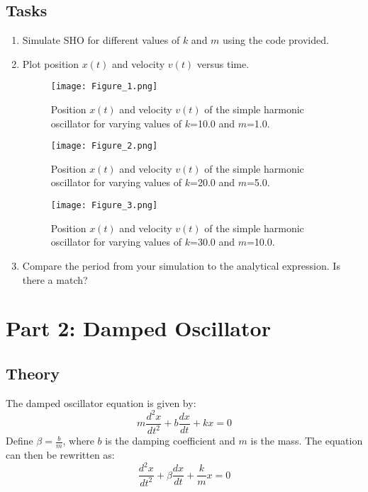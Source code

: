 \documentclass {article}
\begin{document}
\subsection*{Tasks}
\begin{enumerate}
    \item Simulate SHO for different values of $k$ and $m$ using the code provided.
    \item Plot position $x(t)$ and velocity $v(t)$ versus time.
    \begin{figure}[H]
    \centering
    \texttt{[image: Figure\_1.png]}
    \caption{Position $x(t)$ and velocity $v(t)$ of the simple harmonic oscillator for varying values of $k$=10.0 and $m$=1.0.}
    \label{fig:sho_simulation}
    \end{figure}

    \begin{figure}[H]
        \centering
        \texttt{[image: Figure\_2.png]}
        \caption{Position $x(t)$ and velocity $v(t)$ of the simple harmonic oscillator for varying values of $k$=20.0 and $m$=5.0.}
        \label{fig:sho_simulation}
    \end{figure}

    \begin{figure}[H]
        \centering
        \texttt{[image: Figure\_3.png]}
        \caption{Position $x(t)$ and velocity $v(t)$ of the simple harmonic oscillator for varying values of $k$=30.0 and $m$=10.0.}
        \label{fig:sho_simulation}
    \end{figure}
    \item Compare the period from your simulation to the analytical expression. Is there a match? 
\end{enumerate}

\section*{Part 2: Damped Oscillator}
\subsection*{Theory}
The damped oscillator equation is given by:
\[ m \frac{d^2x}{dt^2} + b \frac{dx}{dt} + kx = 0 \]
Define \( \beta = \frac{b}{m} \), where \( b \) is the damping coefficient and \( m \) is the mass. The equation can then be rewritten as:
\[ \frac{d^2x}{dt^2} + \beta \frac{dx}{dt} + \frac{k}{m}x = 0 \]
\end{document}
